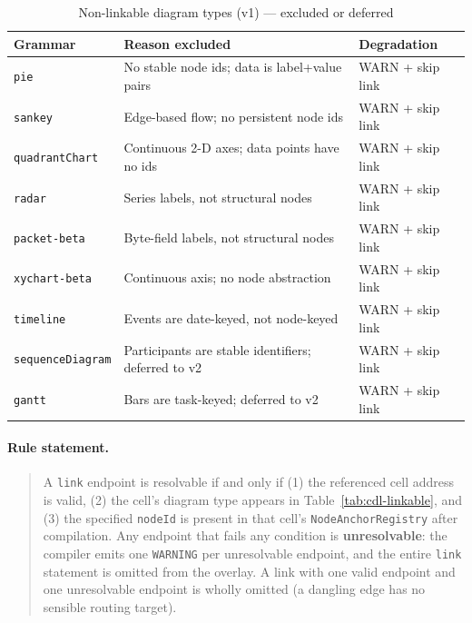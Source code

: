 \begin{table}[h]
\centering\small
\caption{Non-linkable diagram types (v1) --- excluded or deferred}
\begin{tabularx}{\textwidth}{llX}
\toprule
\textbf{Grammar} & \textbf{Reason excluded} & \textbf{Degradation} \\
\midrule
\texttt{pie} & No stable node ids; data is label+value pairs & WARN + skip link \\
\texttt{sankey} & Edge-based flow; no persistent node ids & WARN + skip link \\
\texttt{quadrantChart} & Continuous 2-D axes; data points have no ids & WARN + skip link \\
\texttt{radar} & Series labels, not structural nodes & WARN + skip link \\
\texttt{packet-beta} & Byte-field labels, not structural nodes & WARN + skip link \\
\texttt{xychart-beta} & Continuous axis; no node abstraction & WARN + skip link \\
\texttt{timeline} & Events are date-keyed, not node-keyed & WARN + skip link \\
\texttt{sequenceDiagram} & Participants are stable identifiers; deferred to v2 & WARN + skip link \\
\texttt{gantt} & Bars are task-keyed; deferred to v2 & WARN + skip link \\
\bottomrule
\end{tabularx}
\label{tab:cdl-non-linkable}
\end{table}

\paragraph{Rule statement.}

\begin{quote}
A \texttt{link} endpoint is resolvable if and only if (1) the referenced cell
address is valid, (2) the cell's diagram type appears in
Table~\ref{tab:cdl-linkable}, and (3) the specified \texttt{nodeId} is present
in that cell's \texttt{NodeAnchorRegistry} after compilation.  Any endpoint
that fails any condition is \textbf{unresolvable}: the compiler emits one
\texttt{WARNING} per unresolvable endpoint, and the entire \texttt{link}
statement is omitted from the overlay.  A link with one valid endpoint and one
unresolvable endpoint is wholly omitted (a dangling edge has no sensible
routing target).
\end{quote}

